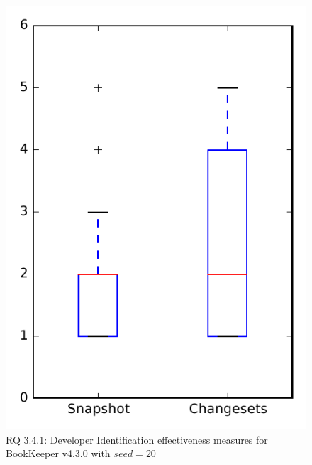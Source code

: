 
\begin{figure}
\centering
\includegraphics[height=0.4\textheight]{figures/dit_seed/rq1_bookkeeper_20}
\caption{RQ 3.4.1: Developer Identification effectiveness measures for BookKeeper v4.3.0 with $seed=20$}
\label{fig:dit_seed:rq1:bookkeeper}
\end{figure}

